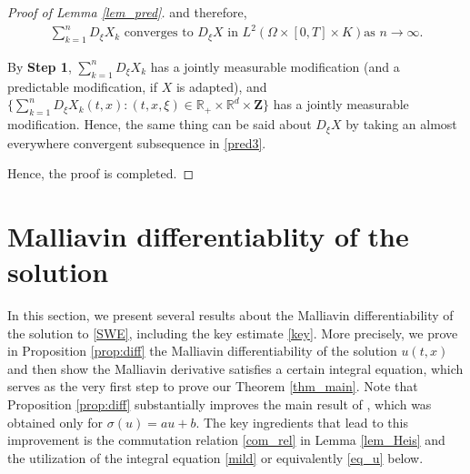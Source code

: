 \documentclass[letterpaper, 11pt,  reqno]{amsart}
\newcommand{\noi}{\noindent}
\newcommand{\R}{\mathbb{R}}
\newcommand{\s}{\sigma}
\renewcommand{\O}{\Omega}
\numberwithin{equation}{section}
\numberwithin{theorem}{section}
\begin{document}
\begin{proof}[Proof of Lemma \ref{lem_pred}]
 \noi
 and therefore, 
\begin{align} \label{pred3}
 \text{$\sum_{k=1}^{n}D_{\xi}X_k$ converges to $D_\xi X$ 
 in $L^2(\O \times [0,T]\times K)$
as $n\to \infty$}. 
\end{align}


By {\bf Step 1}, $\sum_{k=1}^{n}D_{\xi}X_k$ 
has a jointly measurable modification 
(and a predictable modification, if $X$ is adapted),
and $\{\sum_{k=1}^{n}D_{\xi}X_k(t,x): (t, x, \xi)\in    \R_+\times\R^d \times   \mathbf{Z}\}$
has a jointly measurable modification.
Hence, the same thing can be said about $D_{\xi}X$ 
by taking an almost everywhere convergent subsequence 
in \eqref{pred3}.

\smallskip

Hence, the proof is completed. 
\qedhere



\end{proof}



 



 
\section{Malliavin differentiablity of the solution}
\label{section-Du}

In this section, we present several results about the Malliavin differentiability 
 of the solution to  \eqref{SWE}, including the key estimate  \eqref{key}.
More precisely,  we prove in Proposition  \ref{prop:diff}
the Malliavin differentiability  of the solution $u(t,x)$
and then show the Malliavin derivative satisfies 
 a certain integral equation,
 which serves as the very first step to prove our  Theorem \ref{thm_main}.
 Note that Proposition  \ref{prop:diff} substantially  improves  
 the main result of \cite{BN17}, which was obtained only
  for  $\s(u)=au+b$. 
  The key ingredients that lead to this improvement
  is the  commutation relation \eqref{com_rel} in   Lemma \ref{lem_Heis}
and  the utilization  of the integral equation  \eqref{mild}
  or equivalently \eqref{eq_u} below. 



 
\end{document}
